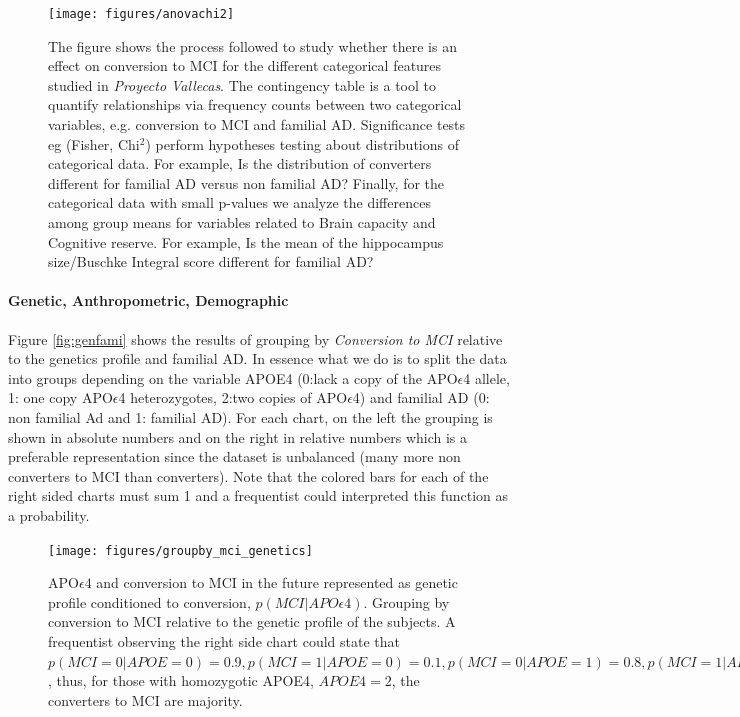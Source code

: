 \documentclass[11pt]{article}
\theoremstyle{definition}
\theoremstyle{remark}
\begin{document}
\begin{figure}[H]
        \centering
        \texttt{[image: figures/anovachi2]}
        \caption{The figure shows the process followed to study whether there is an effect on conversion to MCI for the different categorical features studied in \emph{Proyecto Vallecas}. The contingency table is a tool to quantify relationships via frequency counts between two categorical variables, e.g. conversion to MCI and familial AD. Significance tests eg (Fisher, Chi$^2$) perform hypotheses testing about distributions of categorical data. For example, Is the distribution of converters different for familial AD versus non familial AD? Finally, for the categorical data with small p-values we analyze the differences among group means for variables related to Brain capacity and Cognitive reserve. For example, Is the mean of the hippocampus size/Buschke Integral score different for familial AD?
        } 
        \label{fig:anovachi}
\end{figure}


\paragraph*{Genetic, Anthropometric, Demographic}

Figure \ref{fig:genfami} shows the results of grouping by \emph{Conversion to MCI} relative to the genetics profile and familial AD. In essence what we do is to split the data into groups depending on the variable APOE4 (0:lack a copy of the APO$\epsilon$4 allele, 1: one copy APO$\epsilon$4 heterozygotes, 2:two copies of APO$\epsilon$4) and familial AD (0: non familial Ad and 1: familial AD).
For each chart, on the left the grouping is shown in absolute numbers and on the right in relative numbers which is a preferable representation since the dataset is unbalanced (many more non converters to MCI than converters). Note that the colored bars for each of the right sided charts must sum 1 and a frequentist could interpreted this function as a probability. 


\begin{figure}[H]
        \centering
        \texttt{[image: figures/groupby\_mci\_genetics]}
        \caption{APO$\epsilon4$ and conversion to MCI in the future represented as genetic profile conditioned to conversion, $p(MCI|APO\epsilon4)$. Grouping by conversion to MCI relative to the genetic profile of the subjects. A frequentist observing the right side chart could state that $p(MCI=0|APOE=0)=0.9, p(MCI=1|APOE=0)=0.1, p(MCI=0|APOE=1)=0.8, p(MCI=1|APOE=1)=0.2,p(MCI=0|APOE=2)=0.45, p(MCI=1|APOE=2)=0.55$, thus, for those with homozygotic APOE4, $APOE4=2$, the converters to MCI are majority.} 
        \label{fig:groupby_mci_genetics}
\end{figure}
\end{document}
